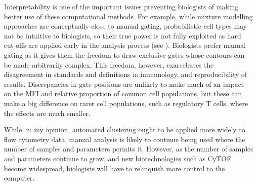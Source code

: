 Interpretability is one of the important issues preventing biologists of making better use of these computational methods.
For example, while mixture modelling approaches are conceptually close to manual gating, probabilistic cell types may not be intuitive to biologists, so their true power is not fully exploited as hard cut-offs are applied early in the analysis process (see ).
Biologists prefer manual gating as it gives them the freedom to draw exclusive gates whose contours can be made arbitrarily complex.
This freedom, however, exarcebates the disagreement in standards and definitions in immunology, and reproducibility of results.
Discrepancies in gate positions are unlikely to make much of an impact on the MFI and relative proportion of common cell populations, but these can make a big difference on rarer cell populations, such as regulatory T cells, where the effects are much smaller.

While, in my opinion, automated clustering ought to be applied more widely to flow cytometry data, manual analysis is likely to continue being used where the number of samples and parameters permits it.
However, as the number of samples and parameters continue to grow, and new biotechnologies such as CyTOF \citep{Becher:2014} become widespread, biologists will have to relinquish more control to the computer.

